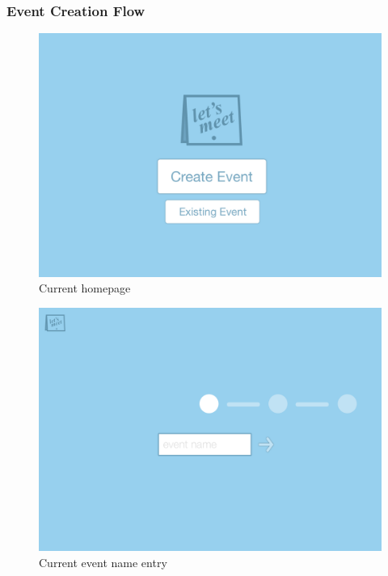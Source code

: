 \documentclass{sigchi}
\begin{document}
\subsubsection{Event Creation Flow}
\begin{figure}
  \centering
  \includegraphics[width=1.75\columnwidth]{Mockup/Home}
  \caption{Current homepage}
\end{figure}

\begin{figure}
  \centering
  \includegraphics[width=1.75\columnwidth]{Mockup/EventName}
  \caption{Current event name entry}
\end{figure}
\end{document}
